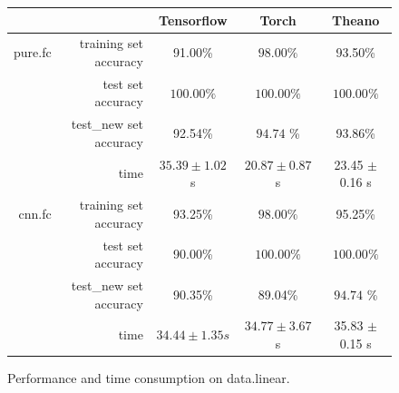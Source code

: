 \documentclass[a4paper]{article}
\begin{document}
\begin{figure}[H]
\centering
\begin{tabular}{|r|r|c|c|c|}
\hline
 & & Tensorflow & Torch & Theano \\
\hline
pure.fc & training set accuracy & 91.00\% & $\bm{98.00\%}$ & 93.50\% \\
 & test set accuracy & $\bm{100.00\%}$ & $\bm{100.00\%}$ & $\bm{100.00\%}$ \\
 & test\_new set accuracy & 92.54\% & $\bm{94.74}$ \% & 93.86\%\\
 & time & $35.39 \pm 1.02$ s & $\bm{20.87 \pm 0.87}$ s & 23.45 $\pm$ 0.16 s \\
\hline
cnn.fc & training set accuracy & 93.25\% & $\bm{98.00\%}$ & 95.25\% \\
 & test set accuracy & 90.00\% & $\bm{100.00\%}$ & $\bm{100.00\%}$ \\
 & test\_new set accuracy & 90.35\% & 89.04\% & $\bm{94.74}$ \% \\
 & time & $\bm{34.44 \pm 1.35} s$ & $34.77 \pm 3.67$s & 35.83 $\pm$ 0.15 s\\
\hline
\end{tabular}
\caption{Performance and time consumption on data.linear.}
\end{figure}
\end{document}
